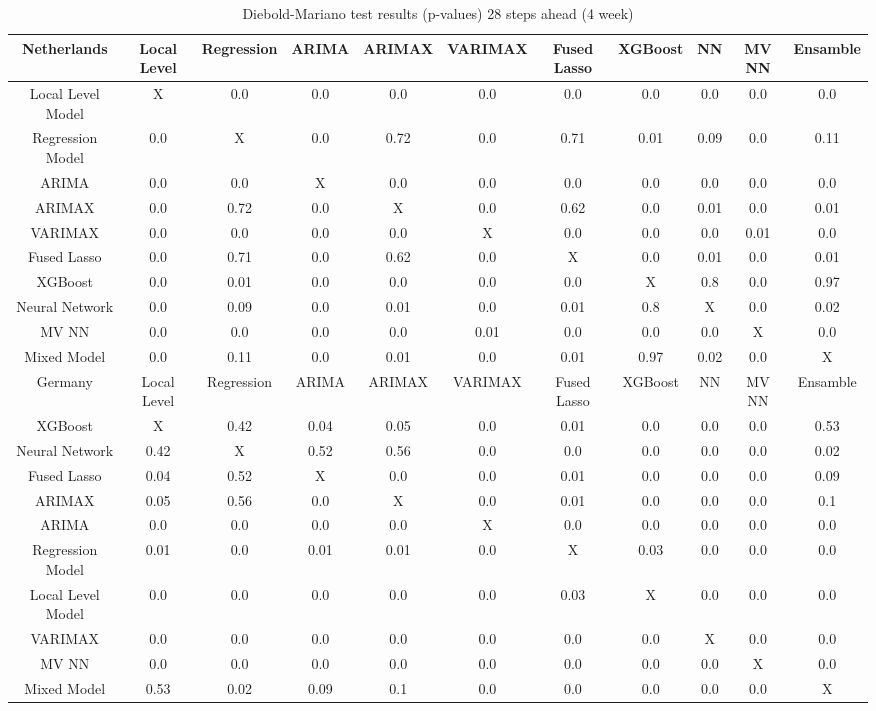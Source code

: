 \begin{landscape}
\pagestyle{empty}
\begin{table}[]
    \centering
    \begin{tabular}{|c|c c c c c c c c c c|}\hline
        Netherlands &  Local Level & Regression & ARIMA & ARIMAX & VARIMAX & Fused Lasso & XGBoost & NN & MV NN & Ensamble\\\hline
        Local Level Model & X & 0.0 & 0.0 & 0.0 & 0.0 & 0.0 & 0.0 & 0.0 & 0.0 & 0.0\\
        Regression Model & 0.0 & X & 0.0 & 0.72 & 0.0 & 0.71 & 0.01 & 0.09 & 0.0 & 0.11\\
        ARIMA & 0.0 & 0.0 & X & 0.0 & 0.0 & 0.0 & 0.0 & 0.0 & 0.0 & 0.0\\
        ARIMAX & 0.0 & 0.72 & 0.0 & X & 0.0 & 0.62 & 0.0 & 0.01 & 0.0 & 0.01\\
        VARIMAX & 0.0 & 0.0 & 0.0 & 0.0 & X & 0.0 & 0.0 & 0.0 & 0.01 & 0.0\\
        Fused Lasso & 0.0 & 0.71 & 0.0 & 0.62 & 0.0 & X & 0.0 & 0.01 & 0.0 & 0.01\\
        XGBoost & 0.0 & 0.01 & 0.0 & 0.0 & 0.0 & 0.0 & X & 0.8 & 0.0 & 0.97\\
        Neural Network & 0.0 & 0.09 & 0.0 & 0.01 & 0.0 & 0.01 & 0.8 & X & 0.0 & 0.02\\
        MV NN & 0.0 & 0.0 & 0.0 & 0.0 & 0.01 & 0.0 & 0.0 & 0.0 & X & 0.0\\
        Mixed Model & 0.0 & 0.11 & 0.0 & 0.01 & 0.0 & 0.01 & 0.97 & 0.02 & 0.0 & X\\\hline\hline
        Germany &  Local Level & Regression & ARIMA & ARIMAX & VARIMAX & Fused Lasso & XGBoost & NN & MV NN & Ensamble\\\hline
        XGBoost & X & 0.42 & 0.04 & 0.05 & 0.0 & 0.01 & 0.0 & 0.0 & 0.0 & 0.53\\
        Neural Network & 0.42 & X & 0.52 & 0.56 & 0.0 & 0.0 & 0.0 & 0.0 & 0.0 & 0.02\\
        Fused Lasso & 0.04 & 0.52 & X & 0.0 & 0.0 & 0.01 & 0.0 & 0.0 & 0.0 & 0.09\\
        ARIMAX & 0.05 & 0.56 & 0.0 & X & 0.0 & 0.01 & 0.0 & 0.0 & 0.0 & 0.1\\
        ARIMA & 0.0 & 0.0 & 0.0 & 0.0 & X & 0.0 & 0.0 & 0.0 & 0.0 & 0.0\\
        Regression Model & 0.01 & 0.0 & 0.01 & 0.01 & 0.0 & X & 0.03 & 0.0 & 0.0 & 0.0\\
        Local Level Model & 0.0 & 0.0 & 0.0 & 0.0 & 0.0 & 0.03 & X & 0.0 & 0.0 & 0.0\\
        VARIMAX & 0.0 & 0.0 & 0.0 & 0.0 & 0.0 & 0.0 & 0.0 & X & 0.0 & 0.0\\
        MV NN & 0.0 & 0.0 & 0.0 & 0.0 & 0.0 & 0.0 & 0.0 & 0.0 & X & 0.0\\
        Mixed Model & 0.53 & 0.02 & 0.09 & 0.1 & 0.0 & 0.0 & 0.0 & 0.0 & 0.0 & X\\
    \hline
    \end{tabular}
    \caption{Diebold-Mariano test results (p-values) 28 steps ahead (4 week)}
    \label{tab:4 week ahead dm}
\end{table}
\end{landscape}

